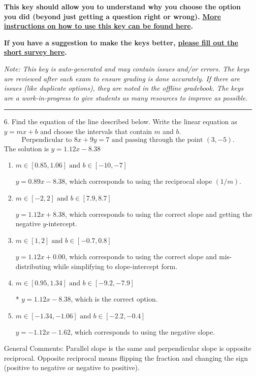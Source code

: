 \documentclass{article}[14pt]
\begin{document}
\textbf{This key should allow you to understand why you choose the option you did (beyond just getting a question right or wrong). \href{https://xronos.clas.ufl.edu/mac1105spring2020/courseDescriptionAndMisc/Exams/LearningFromResults}{More instructions on how to use this key can be found here}.}

\textbf{If you have a suggestion to make the keys better, \href{https://forms.gle/CZkbZmPbC9XALEE88}{please fill out the short survey here}.}

\textit{Note: This key is auto-generated and may contain issues and/or errors. The keys are reviewed after each exam to ensure grading is done accurately. If there are issues (like duplicate options), they are noted in the offline gradebook. The keys are a work-in-progress to give students as many resources to improve as possible.}

\rule{\textwidth}{0.4pt}

6. Find the equation of the line described below. Write the linear equation as $ y=mx+b $ and choose the intervals that contain $m$ and $b$.
$$ \text{Perpendicular to } 8 x + 9 y = 7 \text{ and passing through the point } (3, -5). $$ 
The solution is $ y = 1.12x - 8.38 $ 

\begin{enumerate}[label=\Alph*.] 
\item $ m \in [0.85, 1.06] \text{ and } b \in [-10, -7] $ 

  $y = 0.89x - 8.38$, which corresponds to using the reciprocal slope $(1/m)$. 
\item $ m \in [-2, 2] \text{ and } b \in [7.9, 8.7] $ 

  $y = 1.12x + 8.38$, which corresponds to using the correct slope and getting the negative $y$-intercept. 
\item $ m \in [1, 2] \text{ and } b \in [-0.7, 0.8] $ 

  $y = 1.12x + 0.00$, which corresponds to using the correct slope and mis-distributing while simplifying to slope-intercept form. 
\item $ m \in [0.95, 1.34] \text{ and } b \in [-9.2, -7.9] $ 

 * $y = 1.12x - 8.38$, which is the correct option. 
\item $ m \in [-1.34, -1.06] \text{ and } b \in [-2.2, -0.4] $ 

  $y = -1.12x - 1.62$, which corresponds to using the negative slope. 
\end{enumerate} 
 
General Comments: Parallel slope is the same and perpendicular slope is opposite reciprocal. Opposite reciprocal means flipping the fraction and changing the sign (positive to negative or negative to positive).
\end{document}
